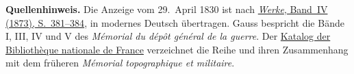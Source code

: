 \par\medskip\begin{small}\noindent\textbf{Quellenhinweis.} Die Anzeige vom 29.~April 1830 ist nach \href{https://gdz.sub.uni-goettingen.de/id/PPN236005081}{\textit{Werke}, Band~IV (1873), S.~381--384}, in modernes Deutsch übertragen. Gauss bespricht die Bände I, III, IV und V des \textit{Mémorial du dépôt général de la guerre}. Der \href{https://catalogue.bnf.fr/ark:/12148/cb422589596}{Katalog der Bibliothèque nationale de France} verzeichnet die Reihe und ihren Zusammenhang mit dem früheren \textit{Mémorial topographique et militaire}.\par\end{small}
